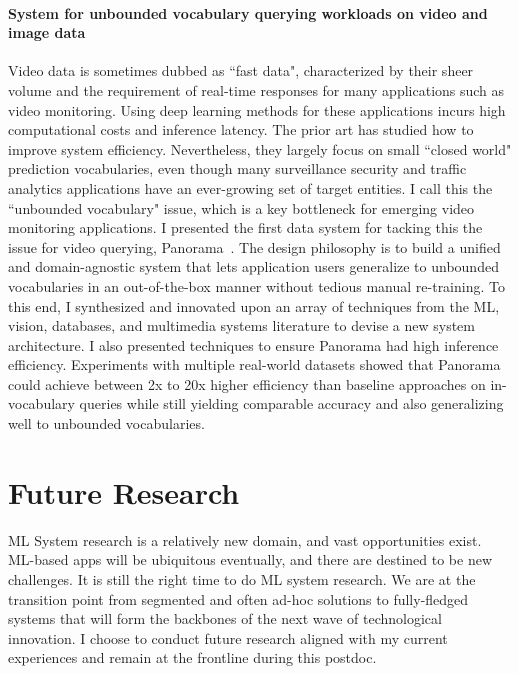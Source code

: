 \documentclass[letterpaper]{article}
\begin{document}
\paragraph{System for unbounded vocabulary querying workloads on video and image data} Video data is sometimes dubbed as ``fast data", characterized by their sheer volume and the requirement of real-time responses for many applications such as video monitoring. Using deep learning methods for these applications incurs high computational costs and inference latency. The prior art has studied how to improve system efficiency. Nevertheless, they largely focus on small ``closed world" prediction vocabularies, even though many surveillance security and traffic analytics applications have an ever-growing set of target entities. I call this the ``unbounded vocabulary" issue, which is a key bottleneck for emerging video monitoring applications. I presented the first data system for tacking this
the issue for video querying, Panorama~\cite{panorama}. The design philosophy
is to build a unified and domain-agnostic system that lets
application users generalize to unbounded vocabularies in an
out-of-the-box manner without tedious manual re-training.
To this end, I synthesized and innovated upon an array of
techniques from the ML, vision, databases, and multimedia systems literature to devise a new system architecture.
I also presented techniques to ensure Panorama had high
inference efficiency. Experiments with multiple real-world
datasets showed that Panorama could achieve between 2x to 20x
higher efficiency than baseline approaches on in-vocabulary
queries while still yielding comparable accuracy and also
generalizing well to unbounded vocabularies.

\section*{Future Research}
ML System research is a relatively new domain, and vast opportunities exist. ML-based apps will be ubiquitous eventually, and there are destined to be new challenges. It is still the right time to do ML system research. We are at the transition point from segmented and often ad-hoc solutions to fully-fledged systems that will form the backbones of the next wave of technological innovation. I choose to conduct future research aligned with my current experiences and remain at the frontline during this postdoc.
\end{document}
